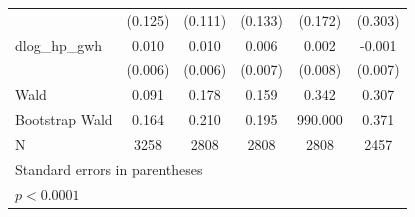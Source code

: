 \begin{table}[htbp]
\begin{tabular}{l*{5}{c}}
            &     (0.125)       &     (0.111)       &     (0.133)       &     (0.172)       &     (0.303)       \\
[1em]
dlog\_hp\_gwh &       0.010       &       0.010       &       0.006       &       0.002       &      -0.001       \\
            &     (0.006)       &     (0.006)       &     (0.007)       &     (0.008)       &     (0.007)       \\
\hline
Wald        &       0.091       &       0.178       &       0.159       &       0.342       &       0.307       \\
Bootstrap Wald&       0.164       &       0.210       &       0.195       &     990.000       &       0.371       \\
N           &        3258       &        2808       &        2808       &        2808       &        2457       \\
\hline\hline
\multicolumn{6}{l}{\footnotesize Standard errors in parentheses}\\
\multicolumn{6}{l}{\footnotesize \sym{*} \(p<0.0001\)}\\
\end{tabular}
\end{table}
